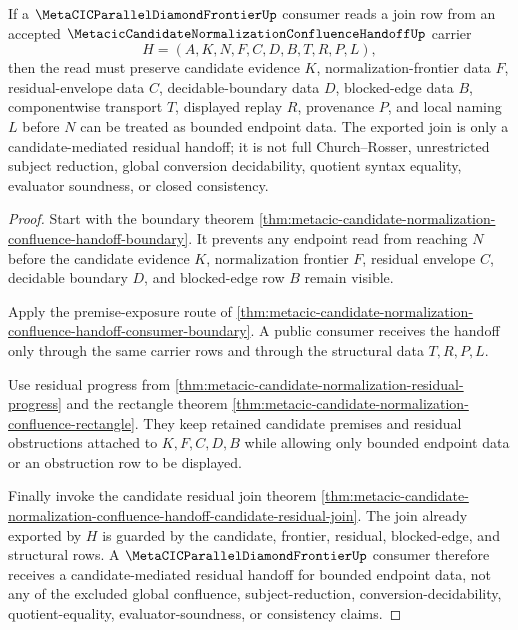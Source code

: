 \begin{theorem}
\label{thm:metacic-candidate-normalization-confluence-handoff-parallel-frontier-consumption}
If a $\MetaCICParallelDiamondFrontierUp$ consumer reads a join row from an accepted $\MetacicCandidateNormalizationConfluenceHandoffUp$ carrier
$$
H=(A,K,N,F,C,D,B,T,R,P,L),
$$
then the read must preserve candidate evidence $K$, normalization-frontier data $F$, residual-envelope data $C$, decidable-boundary data $D$, blocked-edge data $B$, componentwise transport $T$, displayed replay $R$, provenance $P$, and local naming $L$ before $N$ can be treated as bounded endpoint data. The exported join is only a candidate-mediated residual handoff; it is not full Church--Rosser, unrestricted subject reduction, global conversion decidability, quotient syntax equality, evaluator soundness, or closed consistency.
\end{theorem}
\begin{proof}
Start with the boundary theorem \autoref{thm:metacic-candidate-normalization-confluence-handoff-boundary}. It prevents any endpoint read from reaching $N$ before the candidate evidence $K$, normalization frontier $F$, residual envelope $C$, decidable boundary $D$, and blocked-edge row $B$ remain visible.

Apply the premise-exposure route of \autoref{thm:metacic-candidate-normalization-confluence-handoff-consumer-boundary}. A public consumer receives the handoff only through the same carrier rows and through the structural data $T,R,P,L$.

Use residual progress from \autoref{thm:metacic-candidate-normalization-residual-progress} and the rectangle theorem \autoref{thm:metacic-candidate-normalization-confluence-rectangle}. They keep retained candidate premises and residual obstructions attached to $K,F,C,D,B$ while allowing only bounded endpoint data or an obstruction row to be displayed.

Finally invoke the candidate residual join theorem \autoref{thm:metacic-candidate-normalization-confluence-handoff-candidate-residual-join}. The join already exported by $H$ is guarded by the candidate, frontier, residual, blocked-edge, and structural rows. A $\MetaCICParallelDiamondFrontierUp$ consumer therefore receives a candidate-mediated residual handoff for bounded endpoint data, not any of the excluded global confluence, subject-reduction, conversion-decidability, quotient-equality, evaluator-soundness, or consistency claims.
\end{proof}

